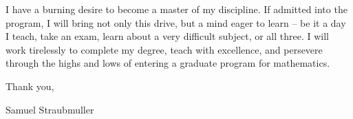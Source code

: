 \documentclass{article}
\begin{document}
\par{I have a burning desire to become a master of my discipline. If admitted into the program, I will bring not only this drive, but a mind eager to learn -- be it a day I teach, take an exam, learn about a very difficult subject, or all three. I will work tirelessly to complete my degree, teach with excellence, and persevere through the highs and lows of entering a graduate program for mathematics.}

\vspace{5mm}

Thank you, 
\vspace{5mm}

Samuel Straubmuller 
 
\end{document}
